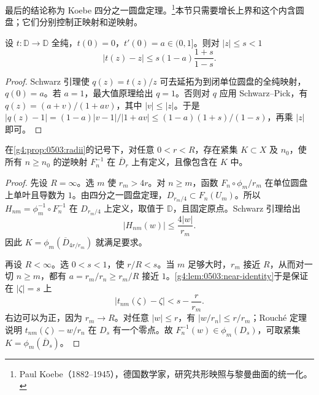 最后的结论称为 Koebe 四分之一圆盘定理。\footnote{Paul Koebe（1882--1945），德国数学家，研究共形映照与黎曼曲面的统一化。}本节只需要增长上界和这个内含圆盘；它们分别控制正映射和逆映射。

\begin{lemma}
	\label{g4:lem:0503:near-identity}
	设 \(t:\mathbb D\to\mathbb D\) 全纯，\(t(0)=0\)，\(t'(0)=a\in(0,1]\)。则对 \(|z|\le s<1\)
	\[
		|t(z)-z|\le s(1-a)\frac{1+s}{1-s}.
	\]
\end{lemma}
\begin{proof}
	Schwarz 引理使 \(q(z)=t(z)/z\) 可去延拓为到闭单位圆盘的全纯映射，\(q(0)=a\)。若 \(a=1\)，最大值原理给出 \(q=1\)。否则对 \(q\) 应用 Schwarz--Pick，有 \(q(z)=(a+v)/(1+av)\)，其中 \(|v|\le|z|\)。于是 \(|q(z)-1|=(1-a)|v-1|/|1+av|\le(1-a)(1+s)/(1-s)\)，再乘 \(|z|\) 即可。
\end{proof}

\begin{lemma}
	\label{g4:lem:0503:inverse-compactness}
	在\cref{g4:prop:0503:radii}的记号下，对任意 \(0<r<R\)，存在紧集 \(K\subset X\) 及 \(n_0\)，使所有 \(n\ge n_0\) 的逆映射 \(F_n^{-1}\) 在 \(\overline D_r\) 上有定义，且像包含在 \(K\) 中。
\end{lemma}
\begin{proof}
	先设 \(R=\infty\)。选 \(m\) 使 \(r_m>4r\)。对 \(n\ge m\)，函数 \(F_n\circ\phi_m/r_m\) 在单位圆盘上单叶且导数为 \(1\)。由四分之一圆盘定理，\(D_{r_m/4}\subset F_n(U_m)\)。所以 \(H_{nm}=\phi_m^{-1}\circ F_n^{-1}\) 在 \(D_{r_m/4}\) 上定义，取值于 \(\mathbb D\)，且固定原点。Schwarz 引理给出
	\[
		|H_{nm}(w)|\le\frac{4|w|}{r_m}.
	\]
	因此 \(K=\phi_m(\overline D_{4r/r_m})\) 就满足要求。

	再设 \(R<\infty\)。选 \(0<s<1\)，使 \(r/R<s\)。当 \(m\) 足够大时，\(r_m\) 接近 \(R\)，从而对一切 \(n\ge m\)，都有 \(a=r_m/r_n\ge r_m/R\) 接近 \(1\)。\cref{g4:lem:0503:near-identity}于是保证在 \(|\zeta|=s\) 上
	\[
		|t_{nm}(\zeta)-\zeta|<s-\frac r{r_m}.
	\]
	右边可以为正，因为 \(r_m\to R\)。对任意 \(|w|\le r\)，有 \(|w/r_n|\le r/r_m\)；Rouché 定理说明 \(t_{nm}(\zeta)-w/r_n\) 在 \(D_s\) 有一个零点。故 \(F_n^{-1}(w)\in\phi_m(D_s)\)，可取紧集 \(K=\phi_m(\overline D_s)\)。
\end{proof}

